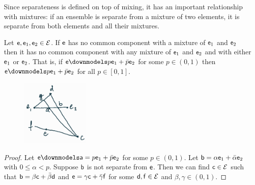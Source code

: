 Since separateness is defined on top of mixing, it has an important relationship with mixtures: if an ensemble is separate from a mixture of two elements, it is separate from both elements and all their mixtures.

\begin{mathSection}
\begin{prop}\label{pm_es_separateExtendsMixtures}
	Let $\ens,\ens_1,\ens_2 \in \Ens$. If $\ens$ has no common component with a mixture of $\ens_1$ and $\ens_2$ then it has no common component with any mixture of $\ens_1$ and $\ens_2$ and with either $\ens_1$ or $\ens_2$. That is, if $\ens \separate p \ens_1 + \bar{p} \ens_2$ for some $p \in (0, 1)$ then $\ens \separate p \ens_1 + \bar{p} \ens_2$ for all $p \in [0, 1]$.
\end{prop}

\begin{figure}[H]
	\centering
	\includegraphics[width=0.3\textwidth]{tempimages/DistinctAndMixture.jpg}
\end{figure}

\begin{proof}
	Let $\ens \separate \ens[a] = p \ens_1 + \bar{p} \ens_2$ for some $p \in (0, 1)$. Let $\ens[b] = \alpha \ens_1 + \bar{\alpha} \ens_2$ with $0 \leq \alpha < p$. Suppose $\ens[b]$ is not separate from $\ens$. Then we can find $\ens[c] \in \Ens$ such that $\ens[b] = \beta \ens[c] + \bar{\beta} \ens[d]$ and $\ens = \gamma \ens[c] + \bar{\gamma} \ens[f]$ for some $\ens[d], \ens[f] \in \Ens$ and $\beta, \gamma \in (0, 1)$.
	

\end{proof}
\end{mathSection}
